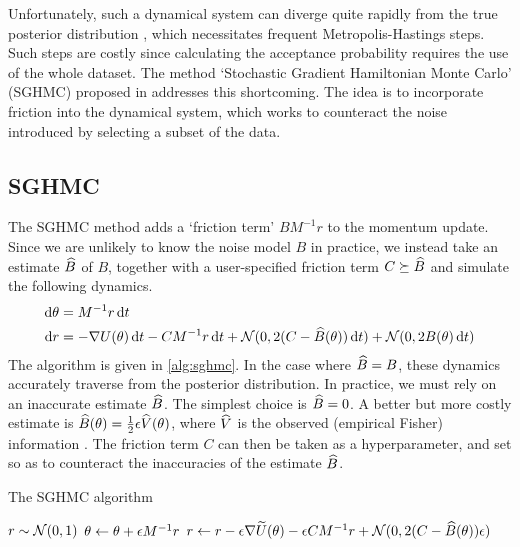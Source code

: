 Unfortunately, such a dynamical system can diverge quite rapidly from the true posterior distribution \cite{neal-hmc}, which necessitates frequent Metropolis-Hastings steps. Such steps are costly since calculating the acceptance probability requires the use of the whole dataset. The method `Stochastic Gradient Hamiltonian Monte Carlo' (SGHMC) proposed in \cite{sghmc} addresses this shortcoming. The idea is to incorporate friction into the dynamical system, which works to counteract the noise introduced by selecting a subset of the data.


\subsection{SGHMC}

The SGHMC method adds a `friction term' $B M^{-1} r$ to the momentum update. Since we are unlikely to know the noise model $B$ in practice, we instead take an estimate $\widehat B$ of $B$, together with a user-specified friction term $C \succeq \widehat B$ and simulate the following dynamics.
\begin{align*}
    \dif\theta &= M^{-1}r \dif t \\
    \dif r &= - \nabla U(\theta) \dif t - CM^{-1}r \dif t + \mc N(0, 2(C - \wh B(\theta))\dif t) + \mc N(0, 2B(\theta) \dif t)
\end{align*}
The algorithm is given in \cref{alg:sghmc}. In the case where $\widehat B = B$, these dynamics accurately traverse from the posterior distribution. In practice, we must rely on an inaccurate estimate $\widehat B$. The simplest choice is $\widehat B = 0$. A better but more costly estimate is $\widehat B(\theta) = \frac 1 2 \epsilon \widehat V(\theta)$, where $\widehat V$ is the observed (empirical Fisher) information \cite{sgld-fisher}. The friction term $C$ can then be taken as a hyperparameter, and set so as to counteract the inaccuracies of the estimate $\widehat B$.

\begin{algorithm}
    \caption{The SGHMC algorithm}\label{alg:sghmc}
    \begin{algorithmic}
            \State $r \sim \mathcal N(0,1)$ 
                \State $\theta \gets \theta + \epsilon M^{-1}r$
                \State $r \gets r - \epsilon \nabla \widetilde U(\theta) - \epsilon CM^{-1}r + \mathcal N(0, 2(C- \widehat B(\theta))\epsilon)$
            \EndFor
        \EndFor
    \end{algorithmic}
\end{algorithm}